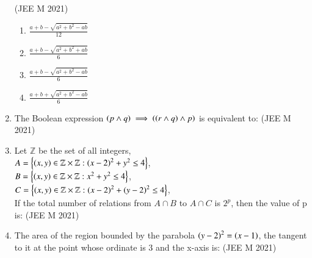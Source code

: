 \documentclass[journal]{IEEEtran}
\begin{document}
\begin{enumerate}
	\hfill{(JEE M 2021)}
	\begin{enumerate}
		\item $\frac{a + b - \sqrt{a^2 + b^2 - ab}}{12}$
		\item $\frac{a + b - \sqrt{a^2 + b^2 + ab}}{6}$
		\item $\frac{a + b - \sqrt{a^2 + b^2 - ab}}{6}$
		\item $\frac{a + b + \sqrt{a^2 + b^2 - ab}}{6}$		
	\end{enumerate}
\item The Boolean expression $\left(p \land q\right) \implies \left(\left(r \land q\right) \land p\right)$ is equivalent to:
	\hfill{(JEE M 2021)}
	\begin{enumerate}
	\end{enumerate}
\item Let $\mathbb{Z}$ be the set of all integers,\\
$A = \left\{\left(x, y\right) \in \mathbb{Z} \times \mathbb{Z} : \left(x-2\right)^2 + y^2 \le 4\right\}$,\\
$B = \left\{\left(x, y\right) \in \mathbb{Z} \times \mathbb{Z} : x^2 + y^2 \le 4\right\}$,\\
$C = \left\{\left(x, y\right) \in \mathbb{Z} \times \mathbb{Z} : \left(x-2\right)^2 + \left(y-2\right)^2 \le 4\right\}$,\\
If the total number of relations from $A \cap B$ to $A \cap C$ is $2^p$, then the value of p is: 
	\hfill{(JEE M 2021)}
	\begin{enumerate}
			\begin{multicols}{2}	
		\item $16$
		\item $25$
		\item $49$
		\item $9$
			\end{multicols}
	\end{enumerate}
\item The area of the region bounded by the parabola $\left(y-2\right)^2 = \left(x-1\right)$, the tangent to it at the point whose ordinate is $3$ and the x-axis is:
	\hfill{(JEE M 2021)}
	\begin{enumerate}
			\begin{multicols}{4}
		\item $9$
		\item $10$
		\item $4$
		\item $6$
			\end{multicols}
	\end{enumerate}
\end{enumerate}
\end{document}
